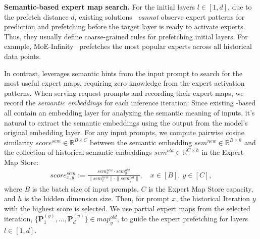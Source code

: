 \textbf{Semantic-based expert map search.} 
For the initial layers $l \in [1, d]$, due to the prefetch distance $d$, existing solutions~\cite{eliseev2023fast,song2024promoe,xue2024moe} \textit{cannot} observe expert patterns for prediction and prefetching before the target layer is ready to activate experts. Thus, they usually define coarse-grained rules for prefetching initial layers. For example, MoE-Infinity~\cite{xue2024moe} prefetches the most popular experts across all historical data points.

In contrast, \sys leverages semantic hints from the input prompt to search for the most useful expert maps, requiring zero knowledge from the expert activation patterns. 
%
When serving request prompts and recording their expert maps, we record the \textit{semantic embeddings} for each inference iteration:
%
%
Since existing \MoE-based \LLMs all contain an embedding layer for analyzing the semantic meaning of inputs, it's natural to extract the semantic embeddings using the output from the model's original embedding layer. 
% 
For any input prompts, we compute pairwise cosine similarity $\textit{score}^{\textit{sem}} \in \mathbb{R}^{B \times C}$ between the semantic embedding $\textit{sem}^{\textit{new}} \in \mathbb{R}^{B \times h}$ and the collection of historical semantic embeddings $\textit{sem}^{\textit{old}} \in \mathbb{R}^{C \times h}$ in the Expert Map Store:
\begin{align}
    \textit{score}^{\textit{sem}}_{x,y} := \frac{\textit{sem}^{\textit{new}}_x \cdot \textit{sem}^{\textit{old}}_y}{\|\textit{sem}^{\textit{new}}_x\| \cdot \|\textit{sem}^{\textit{old}}_y\|}, \quad x \in [B], ~y \in [C],
    \label{eq:score-sem}
\end{align}
%
where $B$ is the batch size of input prompts, $C$ is the Expert Map Store capacity, and $h$ is the hidden dimension size. Then, for prompt $x$, the historical Iteration $y$ with the highest score is selected. 
% 
We use partial expert maps from the selected iteration, $\{\mathbf{P}^{(y)}_1, \ldots, \mathbf{P}^{(y)}_d\} \in \textit{map}^{\textit{old}}_y$, to guide the expert prefetching for layers $l \in [1, d]$. 


